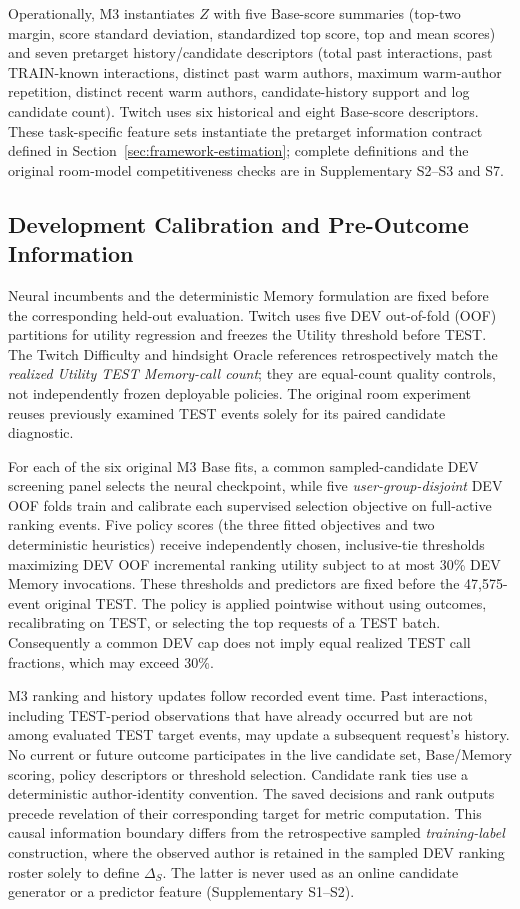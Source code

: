 Operationally, M3 instantiates $Z$ with five Base-score summaries (top-two margin, score standard deviation, standardized top score, top and mean scores) and seven pretarget history/candidate descriptors (total past interactions, past TRAIN-known interactions, distinct past warm authors, maximum warm-author repetition, distinct recent warm authors, candidate-history support and log candidate count). Twitch uses six historical and eight Base-score descriptors. These task-specific feature sets instantiate the pretarget information contract defined in Section~\ref{sec:framework-estimation}; complete definitions and the original room-model competitiveness checks are in Supplementary S2--S3 and S7.

\subsection{Development Calibration and Pre-Outcome Information}
\label{sec:exp-freeze}

Neural incumbents and the deterministic Memory formulation are fixed before the corresponding held-out evaluation. Twitch uses five DEV out-of-fold (OOF) partitions for utility regression and freezes the Utility threshold before TEST. The Twitch Difficulty and hindsight Oracle references retrospectively match the \emph{realized Utility TEST Memory-call count}; they are equal-count quality controls, not independently frozen deployable policies. The original room experiment reuses previously examined TEST events solely for its paired candidate diagnostic.

For each of the six original M3 Base fits, a common sampled-candidate DEV screening panel selects the neural checkpoint, while five \emph{user-group-disjoint} DEV OOF folds train and calibrate each supervised selection objective on full-active ranking events. Five policy scores (the three fitted objectives and two deterministic heuristics) receive independently chosen, inclusive-tie thresholds maximizing DEV OOF incremental ranking utility subject to at most 30\% DEV Memory invocations. These thresholds and predictors are fixed before the 47,575-event original TEST. The policy is applied pointwise without using outcomes, recalibrating on TEST, or selecting the top requests of a TEST batch. Consequently a common DEV cap does not imply equal realized TEST call fractions, which may exceed 30\%.

M3 ranking and history updates follow recorded event time. Past interactions, including TEST-period observations that have already occurred but are not among evaluated TEST target events, may update a subsequent request's history. No current or future outcome participates in the live candidate set, Base/Memory scoring, policy descriptors or threshold selection. Candidate rank ties use a deterministic author-identity convention. The saved decisions and rank outputs precede revelation of their corresponding target for metric computation. This causal information boundary differs from the retrospective sampled \emph{training-label} construction, where the observed author is retained in the sampled DEV ranking roster solely to define $\Delta_S$. The latter is never used as an online candidate generator or a predictor feature (Supplementary S1--S2).

